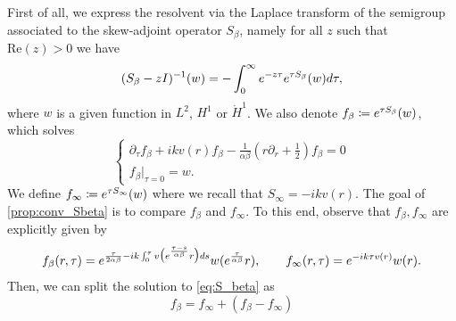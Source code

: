 \documentclass[11pt,reqno]{amsproc}
\def\dd{{\rm d}}
\def\e{{\rm e}}
\def\de{{\partial}}
\def\HH {\dot{H}^1}
\theoremstyle{definition}
\theoremstyle{definition}
\numberwithin{equation}{section}
\begin{document}
First of all, we express the resolvent via the Laplace transform of the semigroup associated to the skew-adjoint operator $S_\beta$, namely for all $z$ such that $\mathrm{Re}(z)>0$ we have
\begin{equation}
\label{eq:S_beta_integral}
(S_\beta-zI)^{-1}(w)=-\int_0^{\infty}\e^{-z \tau}\e^{\tau S_\beta }(w) \dd \tau,
\end{equation}
where $w$ is a given function in $L^2$, $H^1$ or $\HH$. We also denote $f_\beta \coloneqq \e^{\tau S_\beta }(w)$, which solves 
\begin{equation}
\label{eq:S_beta}
\begin{cases}
    \partial_\tau f_\beta+ ikv(r)f_\beta-\frac{1}{\alpha\beta}(r\de_r+\frac12)f_\beta = 0\\
    f_\beta|_{\tau = 0} = w.
\end{cases}
\end{equation}
We define $f_\infty \coloneqq\e^{\tau S_\infty}(w)$ where we recall that $S_\infty=-ikv(r)$. The goal of \cref{prop:conv_Sbeta} is to compare $f_\beta$ and $f_\infty$. To this end, observe that $f_\beta, f_\infty$ are explicitly given by 
\begin{equation}
\label{eq:fbetainfty}
    f_\beta(r,\tau)=\e^{\frac{\tau}{2\alpha\beta}-ik\int_0^\tau v\big(\e^{\frac{\tau-s}{\alpha\beta}}r\big)\dd s}w(\e^{\frac{\tau}{\alpha\beta}}r) 
,\qquad f_\infty(r,\tau)=\e^{-ik\tau v(r)}w(r).
\end{equation}
Then, we can split the solution to \cref{eq:S_beta} as 
\begin{equation}
    f_\beta= f_\infty+(f_\beta-f_\infty)
\end{equation}
\end{document}
